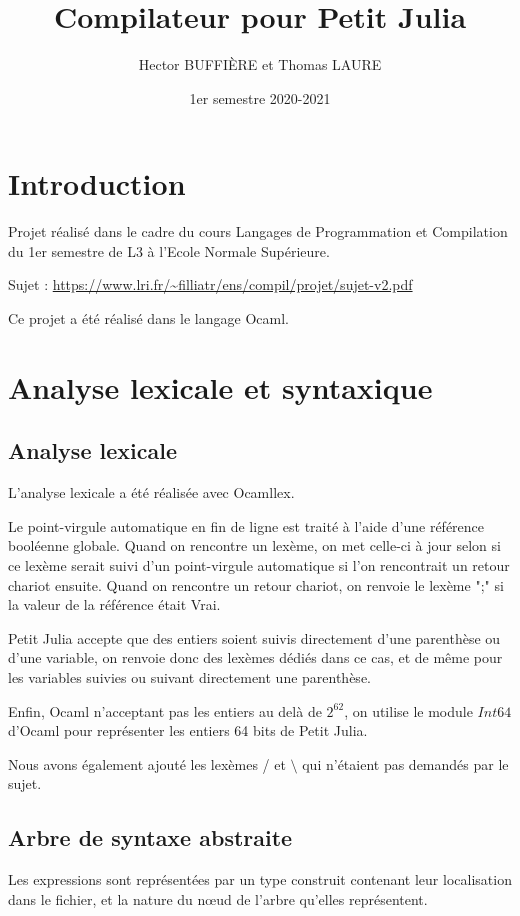 \documentclass[10pt,a4paper]{article}
\begin{document}
\title{Compilateur pour Petit Julia}
\author{Hector BUFFIÈRE et Thomas LAURE}
\date{1er semestre 2020-2021}
\maketitle

\section{Introduction}
Projet réalisé dans le cadre du cours Langages de Programmation et Compilation du 1er semestre de L3 à l'Ecole Normale Supérieure.

Sujet : \url{https://www.lri.fr/~filliatr/ens/compil/projet/sujet-v2.pdf}

Ce projet a été réalisé dans le langage Ocaml.

\section{Analyse lexicale et syntaxique}
\subsection{Analyse lexicale}
L'analyse lexicale a été réalisée avec Ocamllex.

Le point-virgule automatique en fin de ligne est traité à l'aide d'une référence booléenne globale. Quand on rencontre un lexème, on met celle-ci à jour selon si ce lexème serait suivi d'un point-virgule automatique si l'on rencontrait un retour chariot ensuite. Quand on rencontre un retour chariot, on renvoie le lexème ";" si la valeur de la référence était Vrai. 

Petit Julia accepte que des entiers soient suivis directement d'une parenthèse ou d'une variable, on renvoie donc des lexèmes dédiés dans ce cas, et de même pour les variables suivies ou suivant directement une parenthèse.

Enfin, Ocaml n'acceptant pas les entiers au delà de $2^{62}$, on utilise le module $Int64$ d'Ocaml pour représenter les entiers 64 bits de Petit Julia.

Nous avons également ajouté les lexèmes / et $\setminus $ qui n'étaient pas demandés par le sujet.

\subsection{Arbre de syntaxe abstraite}
Les expressions sont représentées par un type construit contenant leur localisation dans le fichier, et la nature du nœud de l'arbre qu'elles représentent.
\end{document}
